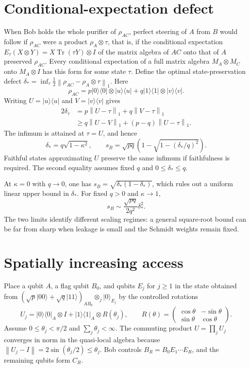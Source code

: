 \documentclass[11pt,a4paper]{article}
\theoremstyle{definition}
\theoremstyle{plain}
\DeclareMathOperator{\Tr}{Tr}
\newcommand{\ket}[1]{\lvert#1\rangle}
\newcommand{\bra}[1]{\langle#1\rvert}
\newcommand{\norm}[1]{\left\lVert#1\right\rVert}
\begin{document}
\section{Conditional-expectation defect}\label{sec:ce}
When Bob holds the whole purifier of $\rho_{AC}$, perfect steering of $A$
from $B$ would follow if $\rho_{AC}$ were a product $\rho_A\otimes\tau$, that
is, if the conditional expectation
$E_\tau(X\otimes Y)=X\Tr(\tau Y)\otimes I$ of the matrix algebra of $AC$
onto that of $A$ preserved $\rho_{AC}$. Every conditional expectation of a
full matrix algebra $M_A\otimes M_C$ onto $M_A\otimes I$ has this form for
some state $\tau$. Define the optimal state-preservation defect
$\delta_*=\inf_\tau\frac12\norm{\rho_{AC}-\rho_A\otimes\tau}_1$. Here
\[
\rho_{AC}=p\ket0\bra0\otimes\ket u\bra u
+q\ket1\bra1\otimes\ket v\bra v.
\]
Writing $U=\ket u\bra u$ and $V=\ket v\bra v$ gives
\begin{align*}
2\delta_\tau&=p\norm{U-\tau}_1+q\norm{V-\tau}_1\\
&\geq q\norm{U-V}_1+(p-q)\norm{U-\tau}_1.
\end{align*}
The infimum is attained at $\tau=U$, and hence
\begin{equation}\label{delta}
\boxed{\delta_*=q\sqrt{1-\kappa^2},\qquad
s_B=\sqrt{pq}\left(1-\sqrt{1-(\delta_*/q)^2}\right).}
\end{equation}
Faithful states approximating $U$ preserve the same infimum if faithfulness
is required. The second equality assumes fixed $q$ and
$0\leq\delta_*\leq q$.

At $\kappa=0$ with $q\to0$, one has
$s_B=\sqrt{\delta_*(1-\delta_*)}$, which rules out a uniform linear upper
bound in $\delta_*$. For fixed $q>0$ and $\kappa\to1$,
\[
s_B\sim\frac{\sqrt{pq}}{2q^2}\delta_*^2.
\]
The two limits identify different scaling regimes: a general square-root
bound can be far from sharp when leakage is small and the Schmidt weights
remain fixed.

\section{Spatially increasing access}\label{sec:spatial}
Place a qubit $A$, a flag qubit $B_0$, and qubits $E_j$ for $j\geq1$ in the
state obtained from
$(\sqrt p\ket{00}+\sqrt q\ket{11})_{AB_0}\otimes_j\ket0_{E_j}$ by the
controlled rotations
\[
U_j=\ket0\bra0_A\otimes I+\ket1\bra1_A\otimes R(\theta_j),
\qquad
R(\theta)=\begin{pmatrix}\cos\theta&-\sin\theta\\
\sin\theta&\cos\theta\end{pmatrix}.
\]
Assume $0\leq\theta_j<\pi/2$ and $\sum_j\theta_j<\infty$. The commuting
product $U=\prod_jU_j$ converges in norm in the quasi-local algebra because
$\norm{U_j-I}=2\sin(\theta_j/2)\leq\theta_j$. Bob controls
$B_R=B_0E_1\cdots E_R$, and the remaining qubits form $C_R$.
\end{document}
